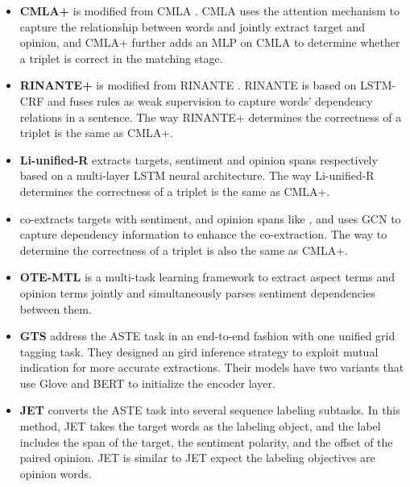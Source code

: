 \documentclass[11pt]{article}
\begin{document}
\begin{itemize}

     \item \textbf{CMLA+} is modified from CMLA \cite{wang2017coupled}. 
     CMLA uses the attention mechanism to capture the relationship between words and jointly extract target and opinion, and CMLA+ further adds an MLP on CMLA to determine whether a triplet is correct in the matching stage.
     
     \item \textbf{RINANTE+} is modified from RINANTE \cite{dai2019neural}. RINANTE is based on LSTM-CRF and fuses rules as weak supervision to capture words' dependency relations in a sentence. The way RINANTE+ determines the correctness of a triplet is the same as CMLA+.
     
     \item \textbf{Li-unified-R}  \cite{li2019unified} extracts targets, sentiment and opinion spans respectively based on a multi-layer LSTM neural architecture. 
     The way Li-unified-R determines the correctness of a triplet is the same as CMLA+.
     
     \item {} co-extracts targets with sentiment, and opinion spans like \cite{li2019unified}, and uses GCN to capture dependency information to enhance the co-extraction. The way to determine the correctness of a triplet is also the same as CMLA+.
     
     \item \textbf{OTE-MTL} \cite{zhang2020multi} is a multi-task learning framework to extract aspect terms and opinion terms jointly and simultaneously parses sentiment dependencies between them. 
     
     \item \textbf{GTS} \cite{wu-etal-2020-grid} address the ASTE task in an end-to-end fashion with one unified grid tagging task. They designed an gird inference strategy to exploit mutual indication for more accurate extractions. Their models have two variants that use Glove and BERT to initialize the encoder layer.
     
     \item \textbf{JET} \cite{xu2020position} converts the ASTE task into several sequence labeling subtasks. 
     In this method, JET takes the target words as the labeling object, and the label includes the span of the target, the sentiment polarity, and the offset of the paired opinion. JET is similar to JET expect the labeling objectives are opinion words.
     
\end{itemize}
\end{document}
